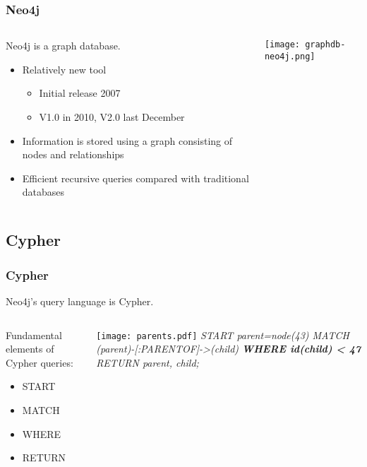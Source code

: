 \documentclass{beamer}
\begin{document}
\begin{frame}
	\frametitle{Neo4j}
	
	
	
\begin{columns} 
\begin{column}{0.60 \textwidth}
Neo4j is a graph database.
		\begin{itemize}
		\item Relatively new tool
			\begin{itemize}
			\item Initial release 2007
			\item V1.0 in 2010, V2.0 last December
			\end{itemize}
		\item Information is stored using a graph consisting of nodes and relationships
		\item Efficient recursive queries compared with traditional databases
		\end{itemize}
		\end{column}
		\begin{column}{0.40\textwidth}
   \texttt{[image: graphdb-neo4j.png]}
       \\
  \end{column}
  \end{columns}

\end{frame}

\subsection{Cypher}

\begin{frame}
	\frametitle{Cypher}
	Neo4j's query language is Cypher.
	\begin{columns}
	\begin{column}{0.40\textwidth}

	Fundamental elements of Cypher queries:
		\begin{itemize}
		\item START
		\item MATCH
		\item WHERE
		\item RETURN
		\end{itemize}
	\end{column}
	\begin{column}{0.60\textwidth}

	\texttt{[image: parents.pdf]}
	\linebreak
	\emph{
START parent=node(43)
\linebreak
MATCH (parent)-[:PARENTOF]->(child)
\linebreak
\textbf{WHERE id(child) < 47}
\linebreak
RETURN parent, child;
}

	\end{column}	
	\end{columns}
\end{frame}
\end{document}
